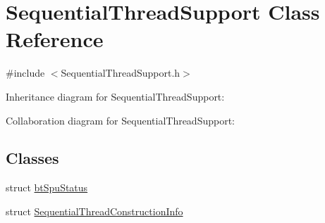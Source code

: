 \hypertarget{class_sequential_thread_support}{\section{Sequential\+Thread\+Support Class Reference}
\label{class_sequential_thread_support}
}


{\ttfamily \#include $<$Sequential\+Thread\+Support.\+h$>$}



Inheritance diagram for Sequential\+Thread\+Support\+:


Collaboration diagram for Sequential\+Thread\+Support\+:
\subsection*{Classes}
\begin{DoxyCompactItemize}
\item 
struct \hyperlink{struct_sequential_thread_support_1_1bt_spu_status}{bt\+Spu\+Status}
\item 
struct \hyperlink{struct_sequential_thread_support_1_1_sequential_thread_construction_info}{Sequential\+Thread\+Construction\+Info}
\end{DoxyCompactItemize}
